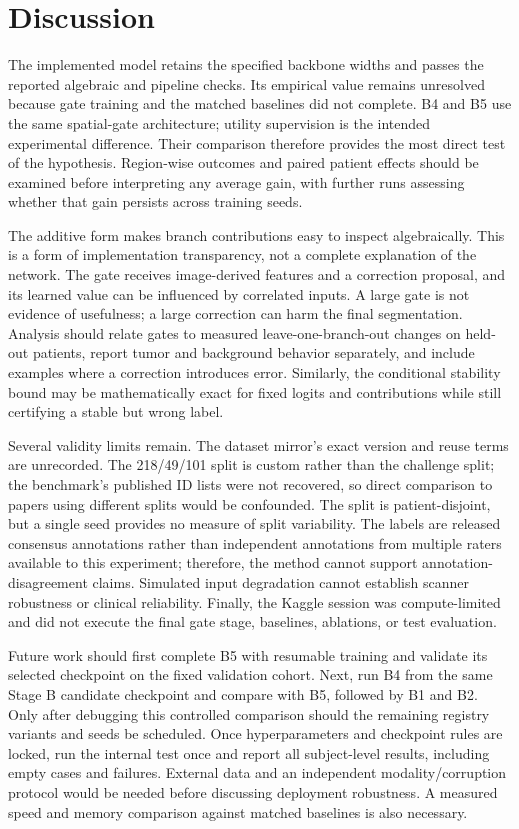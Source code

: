 \documentclass[conference]{IEEEtran}
\begin{document}
\section{Discussion}
The implemented model retains the specified backbone widths and passes the reported algebraic and pipeline checks. Its empirical value remains unresolved because gate training and the matched baselines did not complete. B4 and B5 use the same spatial-gate architecture; utility supervision is the intended experimental difference. Their comparison therefore provides the most direct test of the hypothesis. Region-wise outcomes and paired patient effects should be examined before interpreting any average gain, with further runs assessing whether that gain persists across training seeds.

The additive form makes branch contributions easy to inspect algebraically. This is a form of implementation transparency, not a complete explanation of the network. The gate receives image-derived features and a correction proposal, and its learned value can be influenced by correlated inputs. A large gate is not evidence of usefulness; a large correction can harm the final segmentation. Analysis should relate gates to measured leave-one-branch-out changes on held-out patients, report tumor and background behavior separately, and include examples where a correction introduces error. Similarly, the conditional stability bound may be mathematically exact for fixed logits and contributions while still certifying a stable but wrong label.

Several validity limits remain. The dataset mirror's exact version and reuse terms are unrecorded. The 218/49/101 split is custom rather than the challenge split; the benchmark's published ID lists were not recovered, so direct comparison to papers using different splits would be confounded. The split is patient-disjoint, but a single seed provides no measure of split variability. The labels are released consensus annotations rather than independent annotations from multiple raters available to this experiment; therefore, the method cannot support annotation-disagreement claims. Simulated input degradation cannot establish scanner robustness or clinical reliability. Finally, the Kaggle session was compute-limited and did not execute the final gate stage, baselines, ablations, or test evaluation.

Future work should first complete B5 with resumable training and validate its selected checkpoint on the fixed validation cohort. Next, run B4 from the same Stage B candidate checkpoint and compare with B5, followed by B1 and B2. Only after debugging this controlled comparison should the remaining registry variants and seeds be scheduled. Once hyperparameters and checkpoint rules are locked, run the internal test once and report all subject-level results, including empty cases and failures. External data and an independent modality/corruption protocol would be needed before discussing deployment robustness. A measured speed and memory comparison against matched baselines is also necessary.
\end{document}
